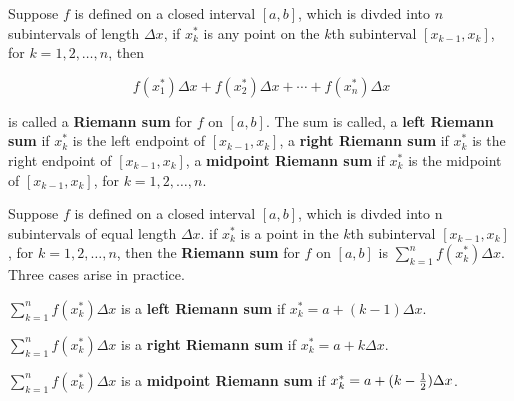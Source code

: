 Suppose $f$ is defined on a closed interval $[a, b]$, which
is divded into $n$ subintervals of length $\Delta x$,
if $x^{*}_{k}$ is any point on the $k$th subinterval
$[x_{k - 1}, x_k]$, for $k = 1, 2, \dots ,n$, then

$$\
f(x^{*}_1)\Delta x + f(x^{*}_2)\Delta x + \cdots + f(x^{*}_n)\Delta x
$$

is called a {\bf Riemann sum} for $f$ on $[a, b]$. The sum is called,
a {\bf left Riemann sum} if
$x^{*}_k$ is the left endpoint of $[x_{k - 1}, x_k]$,
a {\bf right Riemann sum} if
$x^{*}_k$ is the right endpoint of $[x_{k - 1}, x_k]$,
a {\bf midpoint Riemann sum} if
$x^{*}_k$ is the midpoint of $[x_{k - 1}, x_k]$,
for $k = 1, 2, \dots ,n$.
\enddef

Suppose $f$ is defined on a closed interval $[a, b]$, which is
divded into n subintervals of equal length $\Delta x$. if $x^{*}_k$
is a point in the $k$th subinterval $[x_{k - 1}, x_k]$, for
$k = 1, 2, \dots, n$, then the {\bf Riemann sum} for $f$ on $[a, b]$
is
$\sum\limits^{n}_{k = 1} f(x^{*}_k)\Delta x$.
Three
cases arise in practice.

\par
$\sum\limits^{n}_{k = 1} f(x^{*}_k)\Delta x$
is a {\bf left Riemann sum} if $x^{*}_k = a + (k - 1)\Delta x$.

\par
$\sum\limits^{n}_{k = 1} f(x^{*}_k)\Delta x$
is a {\bf right Riemann sum} if $x^{*}_k = a + k\Delta x$.

\par
$\sum\limits^{n}_{k = 1} f(x^{*}_k)\Delta x$
is a {\bf midpoint Riemann sum} if $x^{*}_k = a + (k - {1 \over 2})\Delta x$.

\enddef

\bye


